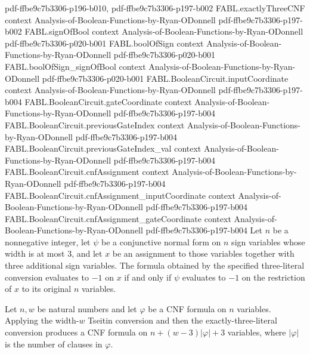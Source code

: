 \begin{theorem}
  {pdf-ffbe9c7b3306-p196-b010,
    pdf-ffbe9c7b3306-p197-b002}
\proofstep
  {FABL.exactlyThreeCNF}
  {context}
  {Analysis-of-Boolean-Functions-by-Ryan-ODonnell}
  {pdf-ffbe9c7b3306-p197-b002}
\proofstep
  {FABL.signOfBool}
  {context}
  {Analysis-of-Boolean-Functions-by-Ryan-ODonnell}
  {pdf-ffbe9c7b3306-p020-b001}
\proofstep
  {FABL.boolOfSign}
  {context}
  {Analysis-of-Boolean-Functions-by-Ryan-ODonnell}
  {pdf-ffbe9c7b3306-p020-b001}
\proofstep
  {FABL.boolOfSign_signOfBool}
  {context}
  {Analysis-of-Boolean-Functions-by-Ryan-ODonnell}
  {pdf-ffbe9c7b3306-p020-b001}
\proofstep
  {FABL.BooleanCircuit.inputCoordinate}
  {context}
  {Analysis-of-Boolean-Functions-by-Ryan-ODonnell}
  {pdf-ffbe9c7b3306-p197-b004}
\proofstep
  {FABL.BooleanCircuit.gateCoordinate}
  {context}
  {Analysis-of-Boolean-Functions-by-Ryan-ODonnell}
  {pdf-ffbe9c7b3306-p197-b004}
\proofstep
  {FABL.BooleanCircuit.previousGateIndex}
  {context}
  {Analysis-of-Boolean-Functions-by-Ryan-ODonnell}
  {pdf-ffbe9c7b3306-p197-b004}
\proofstep
  {FABL.BooleanCircuit.previousGateIndex_val}
  {context}
  {Analysis-of-Boolean-Functions-by-Ryan-ODonnell}
  {pdf-ffbe9c7b3306-p197-b004}
\proofstep
  {FABL.BooleanCircuit.cnfAssignment}
  {context}
  {Analysis-of-Boolean-Functions-by-Ryan-ODonnell}
  {pdf-ffbe9c7b3306-p197-b004}
\proofstep
  {FABL.BooleanCircuit.cnfAssignment_inputCoordinate}
  {context}
  {Analysis-of-Boolean-Functions-by-Ryan-ODonnell}
  {pdf-ffbe9c7b3306-p197-b004}
\proofstep
  {FABL.BooleanCircuit.cnfAssignment_gateCoordinate}
  {context}
  {Analysis-of-Boolean-Functions-by-Ryan-ODonnell}
  {pdf-ffbe9c7b3306-p197-b004}
Let $n$ be a nonnegative integer, let $\psi$ be a conjunctive normal form on $n$ sign
variables whose width is at most $3$, and let $x$ be an assignment to those variables
together with three additional sign variables. The formula obtained by the specified
three-literal conversion evaluates to $-1$ on $x$ if and only if $\psi$ evaluates to
$-1$ on the restriction of $x$ to its original $n$ variables.
\end{theorem}

\begin{definition}
\label{FABL.exactlyThreeTseitin}
\leanok
{}
Let $n,w$ be natural numbers and let $\varphi$ be a CNF formula on $n$ variables. Applying
the width-$w$ Tseitin conversion and then the exactly-three-literal conversion produces
a CNF formula on $n+(w-3)|\varphi|+3$ variables, where $|\varphi|$ is the number of clauses in $\varphi$.
\end{definition}


